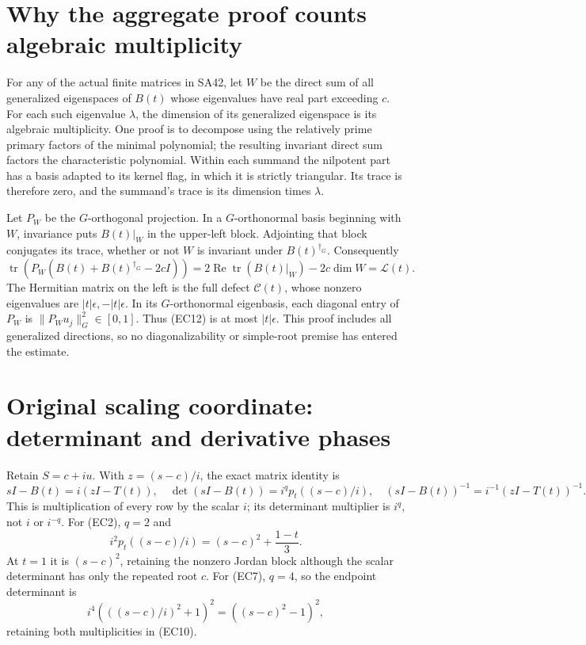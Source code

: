 \documentclass[11pt]{article}
\newcommand{\tr}{\operatorname{tr}}
\begin{document}
\section{Why the aggregate proof counts algebraic multiplicity}

For any of the actual finite matrices in SA42, let \(W\)
be the direct sum of all generalized eigenspaces of \(B(t)\)
whose eigenvalues have real part exceeding \(c\).
For each such eigenvalue \(\lambda\), the dimension of its
generalized eigenspace is its algebraic multiplicity.
One proof is to decompose using the relatively prime
primary factors of the minimal polynomial; the resulting
invariant direct sum factors the characteristic polynomial.
Within each summand the nilpotent part has a basis adapted
to its kernel flag, in which it is strictly triangular.
Its trace is therefore zero, and the summand's trace is
its dimension times \(\lambda\).

Let \(P_W\) be the \(G\)-orthogonal projection. In a
\(G\)-orthonormal basis beginning with \(W\), invariance
puts \(B(t)|_W\) in the upper-left block. Adjointing that
block conjugates its trace, whether or not \(W\) is
invariant under \(B(t)^{\dagger_G}\).
Consequently
\begin{equation}
 \tr(P_W(B(t)+B(t)^{\dagger_G}-2cI))
 =2\operatorname{Re}\tr(B(t)|_W)-2c\dim W
 =\mathcal L(t).
 \tag{EC12}
\end{equation}
The Hermitian matrix on the left is the full defect
\(\mathcal C(t)\), whose nonzero eigenvalues are
\(|t|\epsilon,-|t|\epsilon\). In its \(G\)-orthonormal
eigenbasis, each diagonal entry of \(P_W\) is
\(\|P_Wu_j\|_G^2\in[0,1]\). Thus (EC12) is at most
\(|t|\epsilon\). This proof includes all generalized
directions, so no diagonalizability or simple-root premise
has entered the estimate.

\section{Original scaling coordinate: determinant and derivative phases}

Retain \(S=c+iu\). With \(z=(s-c)/i\), the exact matrix identity is
\begin{equation}
 sI-B(t)=i(zI-T(t)),\quad
 \det(sI-B(t))=i^q p_t((s-c)/i),\quad
 (sI-B(t))^{-1}=i^{-1}(zI-T(t))^{-1}.
 \tag{EC13}
\end{equation}
This is multiplication of every row by the scalar \(i\);
its determinant multiplier is \(i^q\), not \(i\) or \(i^{-q}\).
For (EC2), \(q=2\) and
\[
 i^2p_t((s-c)/i)=(s-c)^2+\frac{1-t}{3}.
\]
At \(t=1\) it is \((s-c)^2\), retaining the nonzero
Jordan block although the scalar determinant has only the
repeated root \(c\). For (EC7), \(q=4\), so the endpoint
determinant is
\[
 i^4(( (s-c)/i)^2+1)^2
       =((s-c)^2-1)^2,
\]
retaining both multiplicities in (EC10).
\end{document}
